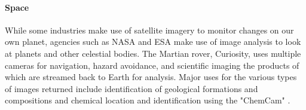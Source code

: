	\paragraph{Space}
	While some industries make use of satellite imagery to monitor changes on our own planet, agencies such as NASA and ESA make use of image analysis to look at planets and other celestial bodies. The Martian rover, Curiosity, uses multiple cameras for navigation, hazard avoidance, and scientific imaging the products of which are streamed back to Earth for analysis. Major uses for the various types of images returned include identification of geological formations and compositions \citep{curiositysand, curiositygravel} and chemical location and identification using the "ChemCam" \citep{curiosityhydrogen}.

